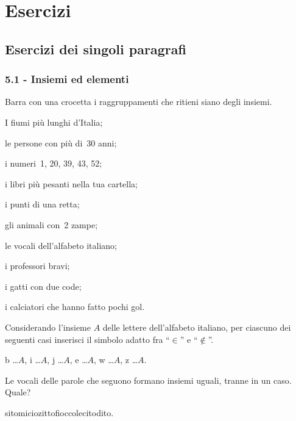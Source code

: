 \section{Esercizi}
\subsection{Esercizi dei singoli paragrafi}
\subsubsection*{5.1 - Insiemi ed elementi}

\begin{esercizio}
 \label{ese:5.1}
 Barra con una crocetta i raggruppamenti che ritieni siano degli insiemi.
 \begin{multicols}{2}
 \begin{enumeratea}
\item I fiumi più lunghi d'Italia;
\item le persone con più di~30 anni;
\item i numeri~1, 20, 39, 43, 52;
\item i libri più pesanti nella tua cartella;
\item i punti di una retta;
\item gli animali con~2 zampe;
\item le vocali dell'alfabeto italiano;
\item i professori bravi;
\item i gatti con due code;
\item i calciatori che hanno fatto pochi gol.
\end{enumeratea}
\end{multicols}
\end{esercizio}

\begin{esercizio}
 \label{ese:5.2}
Considerando l'insieme $A$ delle lettere dell'alfabeto italiano, per ciascuno dei seguenti casi inserisci il simbolo adatto fra ``$\in$'' e ``$\notin$''.

b \ldots $A$, i \ldots $A$, j \ldots $A$, e \ldots $A$, w \ldots $A$, z \ldots $A$.
\end{esercizio}

\begin{esercizio}[\Ast]
\label{ese:5.3}
Le vocali delle parole che seguono formano insiemi uguali, tranne in un caso. Quale?
\begin{center}
 \boxA\quad sito\quad\boxB\quad micio\quad\boxC\quad zitto\quad\boxD\quad fiocco\quad\boxE\quad lecito\quad\boxF\quad dito.
\end{center}
\end{esercizio}

